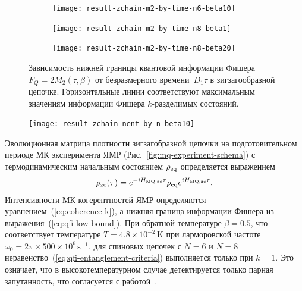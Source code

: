 \begin{figure}[H]
  \begin{subfigure}[t]{0.31\textwidth}
    \texttt{[image: result-zchain-m2-by-time-n6-beta10]}
    \caption{\protect}
    \label{fig:result-zchain-m2-by-time-n6-beta10}
  \end{subfigure}
  \hfill
  \begin{subfigure}[t]{0.31\textwidth}
    \texttt{[image: result-zchain-m2-by-time-n8-beta1]}
    \caption{\protect}
    \label{fig:result-zchain-m2-by-time-n8-beta1}
  \end{subfigure}
  \hfill
  \begin{subfigure}[t]{0.31\textwidth}
    \texttt{[image: result-zchain-m2-by-time-n8-beta20]}
    \caption{\protect}
    \label{fig:result-zchain-m2-by-time-n8-beta20}
  \end{subfigure}
  \caption{
    Зависимость нижней границы квантовой информации Фишера~$F_Q=2M_2(\tau, \beta)$
    от безразмерного времени~$D_1\tau$
    в зигзагообразной цепочке.
    Горизонтальные линии соответствуют максимальным значениям информации Фишера $k$-разделимых состояний.
  }
\end{figure}

\begin{figure}
  \texttt{[image: result-zchain-nent-by-n-beta10]}
  \caption{\protect}
  \label{fig:result-zchain-nent-by-n-beta10}
\end{figure}

Эволюционная матрица плотности зигзагобразной цепочки на подготовительном периоде МК эксперимента ЯМР (Рис.~\ref{fig:mq-experiment-schema})
с термодинамическим начальным состоянием $\rho_\mathrm{eq}$
определяется выражением
%
\begin{equation}\label{eq:rho-eval-zchain}
  \rho_\mathrm{zc}(\tau) = e^{-i H_\mathrm{MQ, zc} \tau}
    \rho_\mathrm{eq} e^{i H_\mathrm{MQ, zc} \tau}.
\end{equation}
%
Интенсивности  МК когерентностей ЯМР определяются уравнением~(\ref{eq:coherence-k}),
а нижняя граница информации Фишера из выражения~(\ref{eq:qfi-low-bound}).
При обратной температуре $\beta=0.5$,
что соответствует температуре $T=4.8 \times 10^{-2}\,\mbox{K}$
при ларморовской частоте $\omega_0=2\pi\times 500\times 10^6 \,\mbox{s}^{-1}$,
для спиновых цепочек с $N=6$ и $N=8$
неравенство~(\ref{eq:qfi-entanglement-criteria})  выполняется только при $k=1$.
Это означает, что в высокотемпературном случае
детектируется только парная запутанность,
что согласуется с работой~\cite{Feldman2012}.


